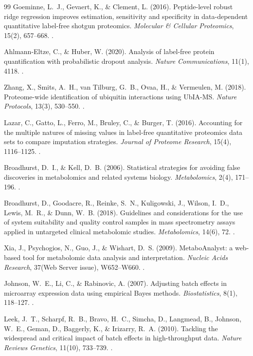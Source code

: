\documentclass[11pt,twoside,openright]{book}
\begin{document}
\begin{thebibliography}{99}
Goeminne, L.~J., Gevaert, K., \& Clement, L. (2016). Peptide-level robust ridge regression improves estimation, sensitivity and specificity in data-dependent quantitative label-free shotgun proteomics. \textit{Molecular \& Cellular Proteomics}, 15(2), 657--668. .

Ahlmann-Eltze, C., \& Huber, W. (2020). Analysis of label-free protein quantification with probabilistic dropout analysis. \textit{Nature Communications}, 11(1), 4118. .

Zhang, X., Smits, A.~H., van Tilburg, G.~B., Ovaa, H., \& Vermeulen, M. (2018). Proteome-wide identification of ubiquitin interactions using UbIA-MS. \textit{Nature Protocols}, 13(3), 530--550. .

Lazar, C., Gatto, L., Ferro, M., Bruley, C., \& Burger, T. (2016). Accounting for the multiple natures of missing values in label-free quantitative proteomics data sets to compare imputation strategies. \textit{Journal of Proteome Research}, 15(4), 1116--1125. .

Broadhurst, D.~I., \& Kell, D.~B. (2006). Statistical strategies for avoiding false discoveries in metabolomics and related systems biology. \textit{Metabolomics}, 2(4), 171--196. .

Broadhurst, D., Goodacre, R., Reinke, S.~N., Kuligowski, J., Wilson, I.~D., Lewis, M.~R., \& Dunn, W.~B. (2018). Guidelines and considerations for the use of system suitability and quality control samples in mass spectrometry assays applied in untargeted clinical metabolomic studies. \textit{Metabolomics}, 14(6), 72. .

Xia, J., Psychogios, N., Guo, J., \& Wishart, D.~S. (2009). MetaboAnalyst: a web-based tool for metabolomic data analysis and interpretation. \textit{Nucleic Acids Research}, 37(Web Server issue), W652--W660. .

Johnson, W.~E., Li, C., \& Rabinovic, A. (2007). Adjusting batch effects in microarray expression data using empirical Bayes methods. \textit{Biostatistics}, 8(1), 118--127. .

Leek, J.~T., Scharpf, R.~B., Bravo, H.~C., Simcha, D., Langmead, B., Johnson, W.~E., Geman, D., Baggerly, K., \& Irizarry, R.~A. (2010). Tackling the widespread and critical impact of batch effects in high-throughput data. \textit{Nature Reviews Genetics}, 11(10), 733--739. .


\end{thebibliography}
\end{document}
